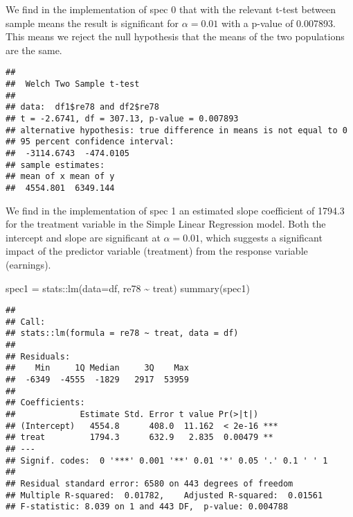 \documentclass[
]{article}
\newenvironment{Shaded}{\begin{snugshade}}{\end{snugshade}}
\newcommand{\AttributeTok}[1]{\textcolor[rgb]{0.77,0.63,0.00}{#1}}
\newcommand{\FunctionTok}[1]{\textcolor[rgb]{0.00,0.00,0.00}{#1}}
\newcommand{\NormalTok}[1]{#1}
\newcommand{\OtherTok}[1]{\textcolor[rgb]{0.56,0.35,0.01}{#1}}
\newcommand{\SpecialCharTok}[1]{\textcolor[rgb]{0.00,0.00,0.00}{#1}}
\begin{document}
We find in the implementation of spec 0 that with the relevant t-test
between sample means the result is significant for \(\alpha = 0.01\)
with a p-value of 0.007893. This means we reject the null hypothesis
that the means of the two populations are the same.

\begin{Shaded}
\end{Shaded}

\begin{verbatim}
## 
##  Welch Two Sample t-test
## 
## data:  df1$re78 and df2$re78
## t = -2.6741, df = 307.13, p-value = 0.007893
## alternative hypothesis: true difference in means is not equal to 0
## 95 percent confidence interval:
##  -3114.6743  -474.0105
## sample estimates:
## mean of x mean of y 
##  4554.801  6349.144
\end{verbatim}

We find in the implementation of spec 1 an estimated slope coefficient
of 1794.3 for the treatment variable in the Simple Linear Regression
model. Both the intercept and slope are significant at
\(\alpha = 0.01\), which suggests a significant impact of the predictor
variable (treatment) from the response variable (earnings).

\begin{Shaded}
\begin{Highlighting}[]
\NormalTok{spec1 }\OtherTok{=}\NormalTok{ stats}\SpecialCharTok{::}\FunctionTok{lm}\NormalTok{(}\AttributeTok{data=}\NormalTok{df, re78 }\SpecialCharTok{\textasciitilde{}}\NormalTok{ treat)}
\FunctionTok{summary}\NormalTok{(spec1)}
\end{Highlighting}
\end{Shaded}

\begin{verbatim}
## 
## Call:
## stats::lm(formula = re78 ~ treat, data = df)
## 
## Residuals:
##    Min     1Q Median     3Q    Max 
##  -6349  -4555  -1829   2917  53959 
## 
## Coefficients:
##             Estimate Std. Error t value Pr(>|t|)    
## (Intercept)   4554.8      408.0  11.162  < 2e-16 ***
## treat         1794.3      632.9   2.835  0.00479 ** 
## ---
## Signif. codes:  0 '***' 0.001 '**' 0.01 '*' 0.05 '.' 0.1 ' ' 1
## 
## Residual standard error: 6580 on 443 degrees of freedom
## Multiple R-squared:  0.01782,    Adjusted R-squared:  0.01561 
## F-statistic: 8.039 on 1 and 443 DF,  p-value: 0.004788
\end{verbatim}
\end{document}
